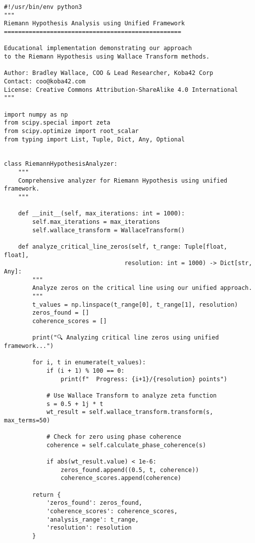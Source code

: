 \documentclass[12pt]{article}
\begin{document}
\begin{lstlisting}
#!/usr/bin/env python3
"""
Riemann Hypothesis Analysis using Unified Framework
==================================================

Educational implementation demonstrating our approach
to the Riemann Hypothesis using Wallace Transform methods.

Author: Bradley Wallace, COO & Lead Researcher, Koba42 Corp
Contact: coo@koba42.com
License: Creative Commons Attribution-ShareAlike 4.0 International
"""

import numpy as np
from scipy.special import zeta
from scipy.optimize import root_scalar
from typing import List, Tuple, Dict, Any, Optional


class RiemannHypothesisAnalyzer:
    """
    Comprehensive analyzer for Riemann Hypothesis using unified framework.
    """

    def __init__(self, max_iterations: int = 1000):
        self.max_iterations = max_iterations
        self.wallace_transform = WallaceTransform()

    def analyze_critical_line_zeros(self, t_range: Tuple[float, float],
                                  resolution: int = 1000) -> Dict[str, Any]:
        """
        Analyze zeros on the critical line using our unified approach.
        """
        t_values = np.linspace(t_range[0], t_range[1], resolution)
        zeros_found = []
        coherence_scores = []

        print("🔍 Analyzing critical line zeros using unified framework...")

        for i, t in enumerate(t_values):
            if (i + 1) % 100 == 0:
                print(f"  Progress: {i+1}/{resolution} points")

            # Use Wallace Transform to analyze zeta function
            s = 0.5 + 1j * t
            wt_result = self.wallace_transform.transform(s, max_terms=50)

            # Check for zero using phase coherence
            coherence = self.calculate_phase_coherence(s)

            if abs(wt_result.value) < 1e-6:
                zeros_found.append((0.5, t, coherence))
                coherence_scores.append(coherence)

        return {
            'zeros_found': zeros_found,
            'coherence_scores': coherence_scores,
            'analysis_range': t_range,
            'resolution': resolution
        }


\end{lstlisting}
\end{document}
